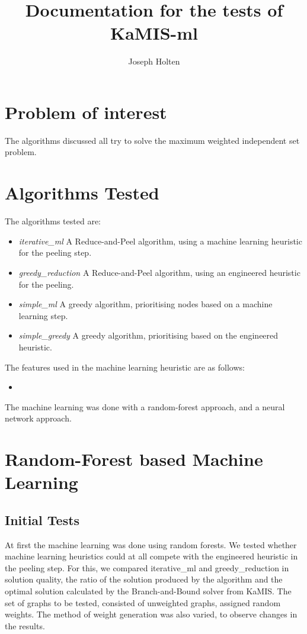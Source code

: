 \documentclass{article}
\title{Documentation for the tests of KaMIS-ml}
\author{Joseph Holten}
\begin{document}
\maketitle

\section{Problem of interest}
The algorithms discussed all try to solve the maximum weighted independent set problem.


\section{Algorithms Tested}
The algorithms tested are:

\begin{itemize}
    \item \textit{iterative\_ml} A Reduce-and-Peel algorithm, using a machine learning heuristic for the peeling step.
    \item \textit{greedy\_reduction} A Reduce-and-Peel algorithm, using an engineered heuristic for the peeling.
    \item \textit{simple\_ml} A greedy algorithm, prioritising nodes based on a machine learning step.
    \item \textit{simple\_greedy} A greedy algorithm, prioritising based on the engineered heuristic.
\end{itemize}

\noindent The features used in the machine learning heuristic are as follows:

\begin{itemize}
    \item 
\end{itemize}

The machine learning was done with a random-forest approach, and a neural network approach.

\section{Random-Forest based Machine Learning}

\subsection{Initial Tests}
At first the machine learning was done using random forests. 
We tested whether machine learning heuristics could at all compete with the engineered heuristic in the peeling step.
For this, we compared iterative\_ml and greedy\_reduction in solution quality, the ratio of the solution produced by the algorithm and the optimal solution calculated by the Branch-and-Bound solver from KaMIS.
The set of graphs to be tested, consisted of unweighted graphs, assigned random weights. The method of weight generation was also varied, to observe changes in the results.



\end{document}
